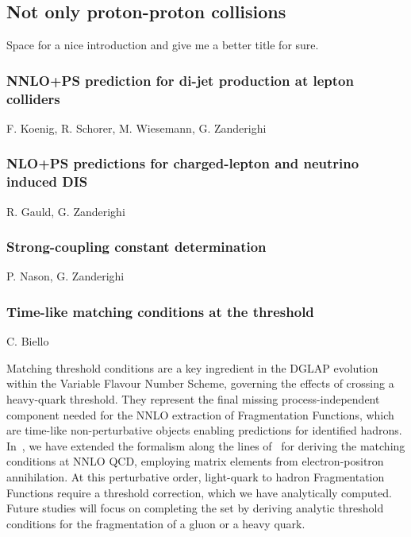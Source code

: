 \documentclass{FBR_Bericht_2025}
\begin{document}
\subsection{Not only proton-proton collisions}
\begin{refsection}
Space for a nice introduction and give me a better title for sure.
%
\subsubsection{NNLO+PS prediction for di-jet production at lepton colliders}
\begin{Namen}
F. Koenig, R. Schorer, M. Wiesemann, G. Zanderighi
\end{Namen}
%
\subsubsection{NLO+PS predictions for charged-lepton and neutrino induced DIS}
\begin{Namen}
R. Gauld, G. Zanderighi
\end{Namen}
%
\subsubsection{Strong-coupling constant determination}
\begin{Namen}
P. Nason, G. Zanderighi
\end{Namen}
%
\subsubsection{Time-like matching conditions at the threshold}
\begin{Namen}
C. Biello
\end{Namen}
Matching threshold conditions are a key ingredient in the DGLAP evolution within the Variable Flavour Number Scheme, governing the effects of crossing a heavy-quark threshold. They represent the final missing process-independent component needed for the NNLO extraction of Fragmentation Functions, which are time-like non-perturbative objects enabling predictions for identified hadrons. In~, we have extended the formalism along the lines of~ for deriving the matching conditions at NNLO QCD, employing matrix elements from electron-positron annihilation. At this perturbative order, light-quark to hadron Fragmentation Functions require a threshold correction, which we have analytically computed. Future studies will focus on completing the set by deriving analytic threshold conditions for the fragmentation of a gluon or a heavy quark.
%

\end{refsection}
\end{document}
